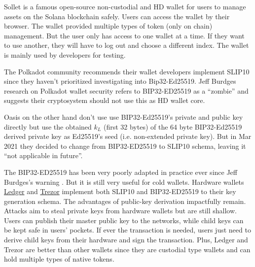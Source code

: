 Sollet \cite{sollet} is a famous open-source non-custodial and HD wallet for users to manage assets on the Solana blockchain safely. Users can access the wallet by their browser. The wallet provided multiple types of token (only on chain) management. But the user only has access to one wallet at a time. If they want to use another, they will have to log out and choose a different index. The wallet is mainly used by developers for testing.

The Polkadot community recommends their wallet developers implement SLIP10 since they haven’t prioritized investigating into Bip32-Ed25519. Jeff Burdges research on Polkadot wallet security refers to BIP32-ED25519 as a “zombie” \cite{Jeff1} and suggests their cryptosystem should not use this as HD wallet core.

Oasis \cite{oasis} on the other hand don't use use BIP32-Ed25519's private and public key directly but use the obtained $k_L$ (first 32 bytes) of the 64 byte BIP32-Ed25519 derived private key as Ed25519's seed (i.e. non-extended private key). But in Mar 2021 they decided to change from BIP32-ED25519 to SLIP10 schema, leaving it “not applicable in future”.

The BIP32-ED25519 has been very poorly adapted in practice ever since Jeff Burdges's warning \cite{Jeff}. But it is still very useful for cold wallets. Hardware wallets \href{https://www.ledger.com/}{Ledger} and \href{https://trezor.io/}{Trezor} implement both SLIP10 and BIP32-ED25519 to their key generation schema. The advantages of public-key derivation impactfully remain. Attacks aim to steal private keys from hardware wallets but are still shallow. Users can publish their master public key to the networks, while child keys can be kept safe in users' pockets. If ever the transaction is needed, users just need to derive child keys from their hardware and sign the transaction. Plus, Ledger and Trezor are better than other wallets since they are custodial type wallets and can hold multiple types of native tokens.

